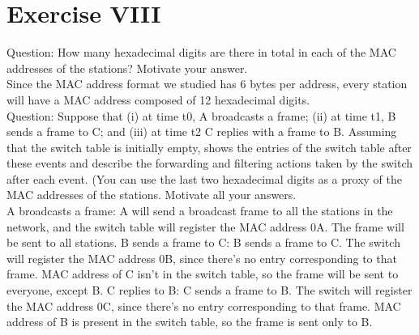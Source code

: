 \documentclass[11pt]{article}
\begin{document}
	\section*{Exercise VIII}
	Question:
	How many hexadecimal digits are there in total in each of the MAC addresses of the stations? Motivate your answer.\\
	Since the MAC address format we studied has 6 bytes per address, every station will have a MAC address composed of 12 hexadecimal digits.\\
	Question:
	Suppose that (i) at time t0, A broadcasts a frame; (ii) at time t1, B sends a frame to C; and (iii) at time t2 C replies with a frame to B. Assuming that the switch table is initially empty, shows the entries of the switch table after these events and describe the forwarding and filtering actions taken by the switch after each event. (You can use the last two hexadecimal digits as a proxy of the MAC addresses of the stations. Motivate all your answers.\\
	A broadcasts a frame: A will send a broadcast frame to all the stations in the network, and the switch table will register the MAC address 0A. The frame will be sent to all stations.
	B sends a frame to C: B sends a frame to C. The switch will register the MAC address 0B, since there's no entry corresponding to that frame. MAC address of C isn't in the switch table, so the frame will be sent to everyone, except B.
	C replies to B: C sends a frame to B. The switch will register the MAC address 0C, since there's no entry corresponding to that frame. MAC address of B is present in the switch table, so the frame is sent only to B.
\end{document}
